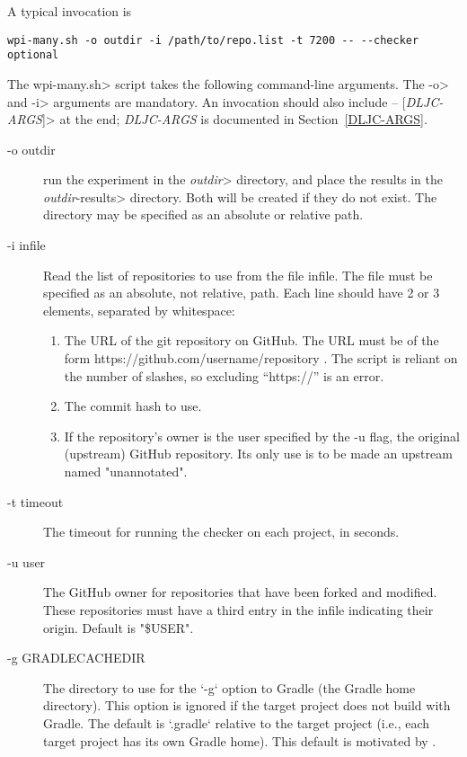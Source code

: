 A typical invocation is

\begin{Verbatim}
wpi-many.sh -o outdir -i /path/to/repo.list -t 7200 -- --checker optional
\end{Verbatim}

The \<wpi-many.sh> script takes the following command-line arguments.
The \<-o> and \<-i> arguments are mandatory.
An invocation should also include \<-- [\emph{DLJC-ARGS}]> at the end;
\emph{DLJC-ARGS} is documented in Section~\ref{DLJC-ARGS}.


\begin{description}
\item[-o outdir]
  run the experiment in the \<\emph{outdir}> directory, and place the results in
  the \<\emph{outdir}-results> directory. Both will be created if they do not
  exist.  The directory may be specified as an absolute or relative path.

\item[-i infile]
  Read the list of repositories to use from the file infile.
  The file must be specified as an absolute, not relative, path.
  Each line
  should have 2 or 3 elements, separated by whitespace:
  \begin{enumerate}
  \item
    The URL of the git repository on GitHub. The URL must be of the form
    https://github.com/username/repository .  The script is reliant on the
    number of slashes, so excluding ``https://'' is an error.
  \item The commit hash to use.
  \item
    If the repository's owner is the user specified by the -u flag, the
    original (upstream) GitHub repository.  Its only use is to be made an
    upstream named "unannotated".
  \end{enumerate}

\item[-t timeout]
  The timeout for running the checker on each project, in seconds.

\item[-u user]
  The GitHub owner for repositories that have been forked and
  modified. These repositories must have a third entry in the infile
  indicating their origin. Default is "\$USER".

\item[-g GRADLECACHEDIR]
  The directory to use for the `-g` option to Gradle (the Gradle home
  directory). This option is ignored if the target project does not
  build with Gradle. The default is `.gradle` relative to the target
  project (i.e., each target project has its own Gradle home). This default
  is motivated by
  .


\end{description}
